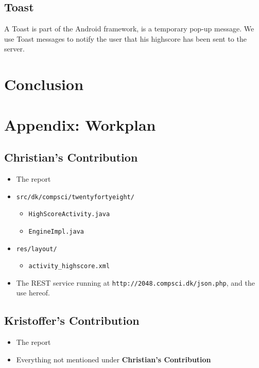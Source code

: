 \documentclass[a4paper, 12pt]{article}
\newcommand{\code}[1]{\texttt{#1}}
\begin{document}

\subsection{Toast}
A Toast is part of the Android framework, is a temporary pop-up message. We use Toast messages to notify the user that his highscore has been sent to the server.


\section{Conclusion}

\newpage
\appendix
\section{Appendix: Workplan}
\subsection{Christian's Contribution}
\begin{itemize}
\item The report
\item \code{src/dk/compsci/twentyfortyeight/}
  \begin{itemize}
  \item \code{HighScoreActivity.java}
  \item \code{EngineImpl.java}
  \end{itemize}
\item \code{res/layout/}
  \begin{itemize}
  \item \code{activity\_highscore.xml}
  \end{itemize}
\item The REST service running at \code{http://2048.compsci.dk/json.php}, and the use hereof.
\end{itemize}
\subsection{Kristoffer's Contribution}
\begin{itemize}
\item The report
\item Everything not mentioned under \textbf{Christian's Contribution}
\end{itemize}
\end{document}
